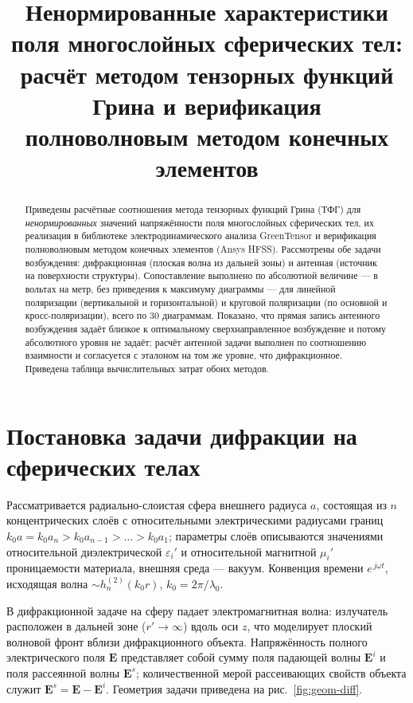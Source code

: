 \documentclass[11pt,a4paper]{article}
\title{Ненормированные характеристики поля многослойных сферических тел:\\
расчёт методом тензорных функций Грина и верификация\\
полноволновым методом конечных элементов}
\author{}
\date{}
\newcommand{\hn}{h_n^{(2)}}
\begin{document}
\maketitle

\begin{abstract}
Приведены расчётные соотношения метода тензорных функций Грина (ТФГ) для
\emph{ненормированных} значений напряжённости поля многослойных сферических тел,
их реализация в библиотеке электродинамического анализа GreenTensor и верификация
полноволновым методом конечных элементов (Ansys HFSS). Рассмотрены обе задачи
возбуждения: дифракционная (плоская волна из дальней зоны) и антенная (источник на
поверхности структуры). Сопоставление выполнено по абсолютной величине --- в вольтах
на метр, без приведения к максимуму диаграммы --- для линейной поляризации
(вертикальной и горизонтальной) и круговой поляризации (по основной и
кросс-поляризации), всего по 30 диаграммам. Показано, что прямая запись антенного
возбуждения задаёт близкое к оптимальному сверхнаправленное возбуждение и потому
абсолютного уровня не задаёт; расчёт антенной задачи выполнен по соотношению
взаимности и согласуется с эталоном на том же уровне, что дифракционное.
Приведена таблица вычислительных затрат обоих методов.
\end{abstract}

\tableofcontents

\clearpage
\section{Постановка задачи дифракции на сферических телах}
\label{sec:diffraction}

Рассматривается радиально-слоистая сфера внешнего радиуса $a$, состоящая из $n$
концентрических слоёв с относительными электрическими радиусами границ
$k_0a = k_0a_n > k_0a_{n-1} > \dots > k_0a_1$; параметры слоёв описываются
значениями относительной диэлектрической $\varepsilon_i'$ и относительной магнитной
$\mu_i'$ проницаемости материала, внешняя среда --- вакуум. Конвенция времени
$e^{\,j\omega t}$, исходящая волна $\sim\hn(k_0r)$, $k_0 = 2\pi/\lambda_0$.

В дифракционной задаче на сферу падает электромагнитная волна: излучатель расположен
в дальней зоне ($r'\to\infty$) вдоль оси $z$, что моделирует плоский волновой фронт
вблизи дифракционного объекта. Напряжённость полного электрического поля $\mathbf{E}$
представляет собой сумму поля падающей волны $\mathbf{E}^i$ и поля рассеянной волны
$\mathbf{E}^s$; количественной мерой рассеивающих свойств объекта служит
$\mathbf{E}^s = \mathbf{E} - \mathbf{E}^i$. Геометрия задачи приведена на
рис.~\ref{fig:geom-diff}.
\end{document}

